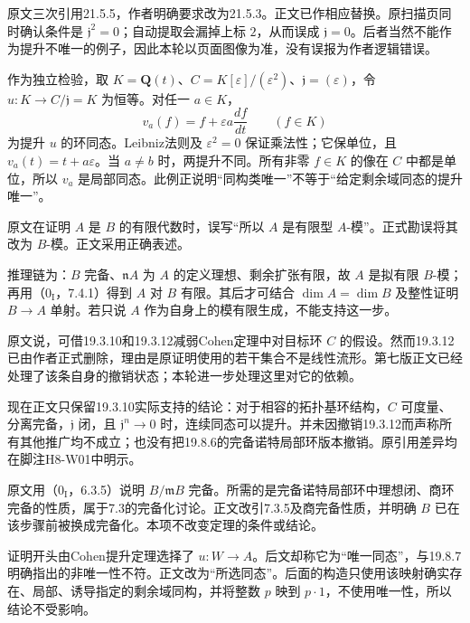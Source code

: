 原文三次引用21.5.5，作者明确要求改为21.5.3。正文已作相应替换。原扫描页同时确认条件是 $\mathfrak j^2=0$；自动提取会漏掉上标 $2$，从而误成 $\mathfrak j=0$。后者当然不能作为提升不唯一的例子，因此本轮以页面图像为准，没有误报为作者逻辑错误。

作为独立检验，取 $K=\mathbf Q(t)$、$C=K[\varepsilon]/(\varepsilon^2)$、$\mathfrak j=(\varepsilon)$，令 $u:K\to C/\mathfrak j=K$ 为恒等。对任一 $a\in K$，
\[
 v_a(f)=f+\varepsilon a\frac{df}{dt}\qquad(f\in K)
\]
为提升 $u$ 的环同态。Leibniz法则及 $\varepsilon^2=0$ 保证乘法性；它保单位，且 $v_a(t)=t+a\varepsilon$。当 $a\ne b$ 时，两提升不同。所有非零 $f\in K$ 的像在 $C$ 中都是单位，所以 $v_a$ 是局部同态。此例正说明“同构类唯一”不等于“给定剩余域同态的提升唯一”。

原文在证明 $A$ 是 $B$ 的有限代数时，误写“所以 $A$ 是有限型 $A$-模”。正式勘误将其改为 $B$-模。正文采用正确表述。

推理链为：$B$ 完备、$\mathfrak nA$ 为 $A$ 的定义理想、剩余扩张有限，故 $A$ 是拟有限 $B$-模；再用（$0_{\mathrm I}$，7.4.1）得到 $A$ 对 $B$ 有限。其后才可结合 $\dim A=\dim B$ 及整性证明 $B\to A$ 单射。若只说 $A$ 作为自身上的模有限生成，不能支持这一步。

原文说，可借19.3.10和19.3.12减弱Cohen定理中对目标环 $C$ 的假设。然而19.3.12已由作者正式删除，理由是原证明使用的若干集合不是线性流形。第七版正文已经处理了该条自身的撤销状态；本轮进一步处理这里对它的依赖。

现在正文只保留19.3.10实际支持的结论：对于相容的拓扑基环结构，$C$ 可度量、分离完备，$\mathfrak j$ 闭，且 $\mathfrak j^n\to0$ 时，连续同态可以提升。并未因撤销19.3.12而声称所有其他推广均不成立；也没有把19.8.6的完备诺特局部环版本撤销。原引用差异均在脚注H8-W01中明示。

原文用（$0_{\mathrm I}$，6.3.5）说明 $B/\mathfrak mB$ 完备。所需的是完备诺特局部环中理想闭、商环完备的性质，属于7.3的完备化讨论。正文改引7.3.5及商完备性质，并明确 $B$ 已在该步骤前被换成完备化。本项不改变定理的条件或结论。

证明开头由Cohen提升定理选择了 $u:W\to A$。后文却称它为“唯一同态”，与19.8.7明确指出的非唯一性不符。正文改为“所选同态”。后面的构造只使用该映射确实存在、局部、诱导指定的剩余域同构，并将整数 $p$ 映到 $p\cdot1$，不使用唯一性，所以结论不受影响。

